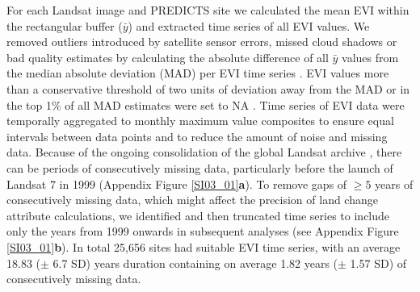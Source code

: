 For each Landsat image and PREDICTS site we calculated the mean EVI within the rectangular buffer ($\bar{y}$) and extracted time series of all EVI values. We removed outliers introduced by satellite sensor errors, missed cloud shadows or bad quality estimates by calculating the absolute difference of all $\bar{y}$ values from the median absolute deviation (MAD) per EVI time series \citep{Leys2013}. EVI values more than a conservative threshold of two units of deviation away from the MAD or in the top 1\% of all MAD estimates were set to NA \citep{Leys2013}. Time series of EVI data were temporally aggregated to monthly maximum value composites to ensure equal intervals between data points and to reduce the amount of noise and missing data. Because of the ongoing consolidation of the global Landsat archive \citep{Wulder2015}, there can be periods of consecutively missing data, particularly before the launch of Landsat 7 in 1999 (Appendix Figure \ref{SI03_01}\textbf{a}). To remove gaps of $\geq 5$ years of consecutively missing data, which might affect the precision of land change attribute calculations, we identified and then truncated time series to include only the years from 1999 onwards in subsequent analyses (see Appendix Figure \ref{SI03_01}\textbf{b}). In total 25,656 sites had suitable EVI time series, with an average 18.83 ($\pm$ 6.7 SD) years duration containing on average 1.82 years ($\pm$ 1.57 SD) of consecutively missing data.

